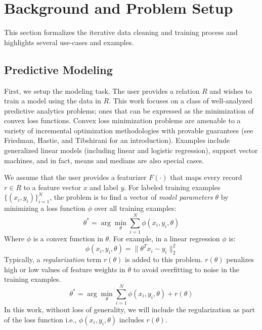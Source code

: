 \section{Background and Problem Setup}\label{background}
This section formalizes the iterative data cleaning and training process and highlights several use-cases and examples.

\subsection{Predictive Modeling}
First, we setup the modeling task.
The user provides a relation $R$ and wishes to train a model using the data in $R$.
This work focuses on a class of well-analyzed predictive analytics problems; ones that can be expressed as the minimization of convex loss functions.
Convex loss minimization problems are amenable to a variety of incremental optimization methodologies with provable guarantees (see Friedman, Hastie, and Tibshirani \cite{friedman2001elements} for an introduction).
Examples include generalized linear models (including linear and logistic regression), support vector machines, and in fact, means and medians are also special cases. 

We assume that the user provides a featurizer $F(\cdot)$ that maps every record $r \in R$ to a feature vector $x$ and label $y$.
For labeled training examples $\{(x_{i},y_{i})\}_{i=1}^{N}$, the problem is to find a vector of \emph{model parameters} $\theta$ by minimizing a loss function $\phi$ over all training examples:
\[
 \theta^{*}=\arg\min_{\theta}\sum_{i=1}^{N}\phi(x_{i},y_{i},\theta)
\]
Where $\phi$ is a convex function in $\theta$.
For example, in a linear regression $\phi$ is:
\[
\phi(x_{i},y_{i},\theta) = \|\theta^Tx_{i} - y_i \|_2^2
\]
Typically, a \emph{regularization} term $r(\theta)$ is added to this problem.
$r(\theta)$ penalizes high or low values of feature weights in $\theta$ to avoid overfitting to noise in the training examples.
\begin{equation}
 \theta^{*}=\arg\min_{\theta}\sum_{i=1}^{N}\phi(x_{i},y_{i},\theta) + r(\theta)
 \label{ideal}
\end{equation}
In this work, without loss of generality, we will include the regularization as part of the loss function i.e., $\phi(x_{i},y_{i},\theta)$ includes $r(\theta)$.

